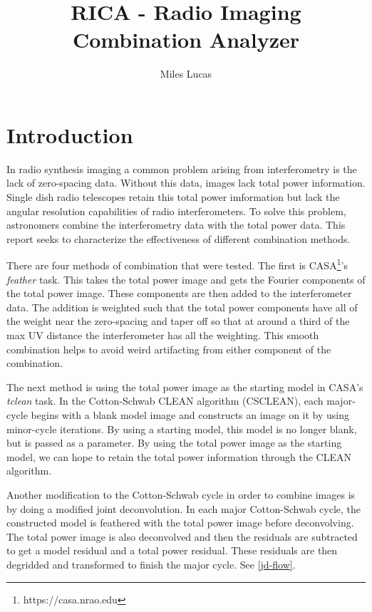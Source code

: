 \documentclass[manuscript,linenumbers]{aastex62}
\begin{document}
\title{RICA - Radio Imaging Combination Analyzer}
\author{Miles Lucas}
 

\begin{abstract}

\end{abstract}

\section{Introduction}

In radio synthesis imaging a common problem arising from interferometry is the lack of zero-spacing data. Without this data, images lack total power information. Single dish radio telescopes retain this total power imformation but lack the angular resolution capabilities of radio interferometers. To solve this problem, astronomers combine the interferometry data with the total power data. This report seeks to characterize the effectiveness of different combination methods.

There are four methods of combination that were tested. The first is CASA\footnote{https://casa.nrao.edu}'s \textit{feather} task. This takes the total power image and gets the Fourier components of the total power image. These components are then added to the interferometer data. The addition is weighted such that the total power components have all of the weight near the zero-spacing and taper off so that at around a third of the max UV distance the interferometer has all the weighting. This smooth combination helps to avoid weird artifacting from either component of the combination.

The next method is using the total power image as the starting model in CASA's \textit{tclean} task. In the Cotton-Schwab CLEAN algorithm (CSCLEAN), each major-cycle begins with a blank model image and constructs an image on it by using minor-cycle iterations. By using a starting model, this model is no longer blank, but is passed as a parameter. By using the total power image as the starting model, we can hope to retain the total power information through the CLEAN algorithm.


Another modification to the Cotton-Schwab cycle in order to combine images is by doing a modified joint deconvolution. In each major Cotton-Schwab cycle, the constructed model is feathered with the total power image before deconvolving. The total power image is also deconvolved and then the residuals are subtracted to get a model residual and a total power residual. These residuals are then degridded and transformed to finish the major cycle. See \autoref{jd-flow}.
\end{document}
